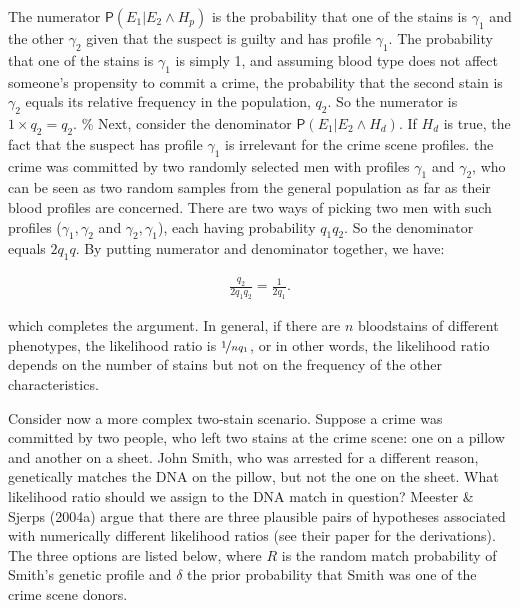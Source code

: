 \documentclass[10pt,dvipsnames,enabledeprecatedfontcommands]{scrartcl}
\newcommand{\pr}[1]{\mathsf{P}(#1)}
\begin{document}
\noindent
 The numerator \(\pr{E_1 \vert E_2 \wedge H_p}\) is the probability that
one of the stains is \(\gamma_1\) and the other \(\gamma_2\) given that
the suspect is guilty and has profile \(\gamma_1\). The probability that
one of the stains is \(\gamma_1\) is simply 1, and assuming blood type
does not affect someone's propensity to commit a crime, the probability
that the second stain is \(\gamma_2\) equals its relative frequency in
the population, \(q_2\). So the numerator is \(1\times q_2 = q_2\). \%
Next, consider the denominator \(\pr{E_1 \vert E_2 \wedge H_d}\). If
\(H_d\) is true, the fact that the suspect has profile \(\gamma_1\) is
irrelevant for the crime scene profiles. the crime was committed by two
randomly selected men with profiles \(\gamma_1\) and \(\gamma_2\), who
can be seen as two random samples from the general population as far as
their blood profiles are concerned. There are two ways of picking two
men with such profiles (\(\gamma_1,\gamma_2\) and
\(\gamma_2,\gamma_1\)), each having probability \(q_1q_2\). So the
denominator equals \(2q_1q\). By putting numerator and denominator
together, we have:

\begin{align*}
 \frac{q_2}{2q_1q_2} = \frac{1}{2q_1}. 
 \end{align*}

\noindent which completes the argument. In general, if there are \(n\)
bloodstains of different phenotypes, the likelihood ratio is
\(\nicefrac{1}{nq_1}\), or in other words, the likelihood ratio depends
on the number of stains but not on the frequency of the other
characteristics.

Consider now a more complex two-stain scenario. Suppose a crime was
committed by two people, who left two stains at the crime scene: one on
a pillow and another on a sheet. John Smith, who was arrested for a
different reason, genetically matches the DNA on the pillow, but not the
one on the sheet. What likelihood ratio should we assign to the DNA
match in question? Meester \& Sjerps (2004a) argue that there are three
plausible pairs of hypotheses associated with numerically different
likelihood ratios (see their paper for the derivations). The three
options are listed below, where \(R\) is the random match probability of
Smith's genetic profile and \(\delta\) the prior probability that Smith
was one of the crime scene donors. \vspace{2mm}
\end{document}
